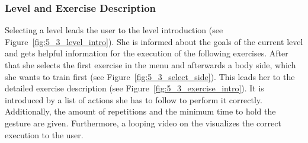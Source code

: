 \subsubsection{Level and Exercise Description}
Selecting a level leads the user to the level introduction (see Figure~\ref{fig:5_3_level_intro}). She is informed about the goals of the current level and gets helpful information for the execution of the following exercises. After that she selects the first exercise in the menu and afterwards a body side, which she wants to train first (see Figure~\ref{fig:5_3_select_side}). This leads her to the detailed exercise description (see Figure~\ref{fig:5_3_exercise_intro}). It is introduced by a list of actions she has to follow to perform it correctly. Additionally, the amount of repetitions and the minimum time to hold the gesture are given. Furthermore, a looping video on the visualizes the correct execution to the user.
